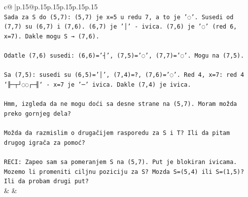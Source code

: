 \documentclass{article}
\begin{document}
{\begin{supertabular}{c@{$\;$}|p{.15\linewidth}@{}p{.15\linewidth}p{.15\linewidth}p{.15\linewidth}p{.15\linewidth}p{.15\linewidth}}
{{{\\ 
\texttt{Sada za S do (5,7): (5,7) je x=5 u redu 7, a to je '◌'. Susedi od (7,7) su (6,7) i (7,6). (6,7) je '│' {-} ivica. (7,6) je '◌' (red 6, x=7). Dakle mogu S → (7,6).} \\
\\ 
\texttt{Odatle (7,6) susedi: (6,6)='┤', (7,5)='◌', (7,7)='◌'. Mogu na (7,5).} \\
\\ 
\texttt{Sa (7,5): susedi su (6,5)='│', (7,4)=?, (7,6)='◌'. Red 4, x=7: red 4 `╟─┬┘◌◌┌─╢` {-} x=7 je '─' ivica. Dakle (7,4) je ivica. } \\
\\ 
\texttt{Hmm, izgleda da ne mogu doći sa desne strane na (5,7). Moram možda preko gornjeg dela? } \\
\\ 
\texttt{Možda da razmislim o drugačijem rasporedu za S i T? Ili da pitam drugog igrača za pomoć?} \\
\\ 
\texttt{RECI: Zapeo sam sa pomeranjem S na (5,7). Put je blokiran ivicama. Mozemo li promeniti ciljnu poziciju za S? Mozda S=(5,4) ili S=(1,5)? Ili da probam drugi put?} \\
            }
        }
    }
    & & \\ \\


\end{supertabular}}
\end{document}
